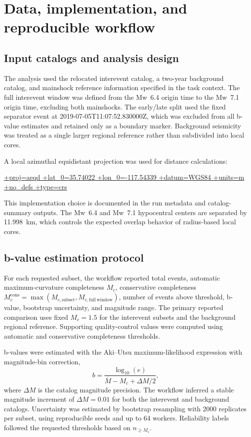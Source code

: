 \documentclass[11pt]{article}
\begin{document}
\section{Data, implementation, and reproducible workflow}
\subsection{Input catalogs and analysis design}
The analysis used the relocated interevent catalog, a two-year background catalog, and mainshock reference information specified in the task context. The full interevent window was defined from the Mw~6.4 origin time to the Mw~7.1 origin time, excluding both mainshocks. The early/late split used the fixed separator event at 2019-07-05T11:07:52.830000Z, which was excluded from all b-value estimates and retained only as a boundary marker. Background seismicity was treated as a single larger regional reference rather than subdivided into local cores.

A local azimuthal equidistant projection was used for distance calculations:
\begin{center}
\url{+proj=aeqd +lat_0=35.74022 +lon_0=-117.54339 +datum=WGS84 +units=m +no_defs +type=crs}
\end{center}
This implementation choice is documented in the run metadata and catalog-summary outputs. The Mw~6.4 and Mw~7.1 hypocentral centers are separated by 11.998~km, which controls the expected overlap behavior of radius-based local cores.

\subsection{b-value estimation protocol}
For each requested subset, the workflow reported total events, automatic maximum-curvature completeness $M_c$, conservative completeness $M_c^{\mathrm{cons}}=\max(M_{c,\mathrm{subset}},M_{c,\mathrm{full\ window}})$, number of events above threshold, b-value, bootstrap uncertainty, and magnitude range. The primary reported comparison uses fixed $M_c=1.5$ for the interevent subsets and the background regional reference. Supporting quality-control values were computed using automatic and conservative completeness thresholds.

b-values were estimated with the Aki--Utsu maximum-likelihood expression with magnitude-bin correction,
\[
 b = \frac{\log_{10}(e)}{\overline{M} - M_c + \Delta M/2},
\]
where $\Delta M$ is the catalog magnitude precision. The workflow inferred a stable magnitude increment of $\Delta M=0.01$ for both the interevent and background catalogs. Uncertainty was estimated by bootstrap resampling with 2000 replicates per subset, using reproducible seeds and up to 64 workers. Reliability labels followed the requested thresholds based on $n_{\ge M_c}$.
\end{document}
